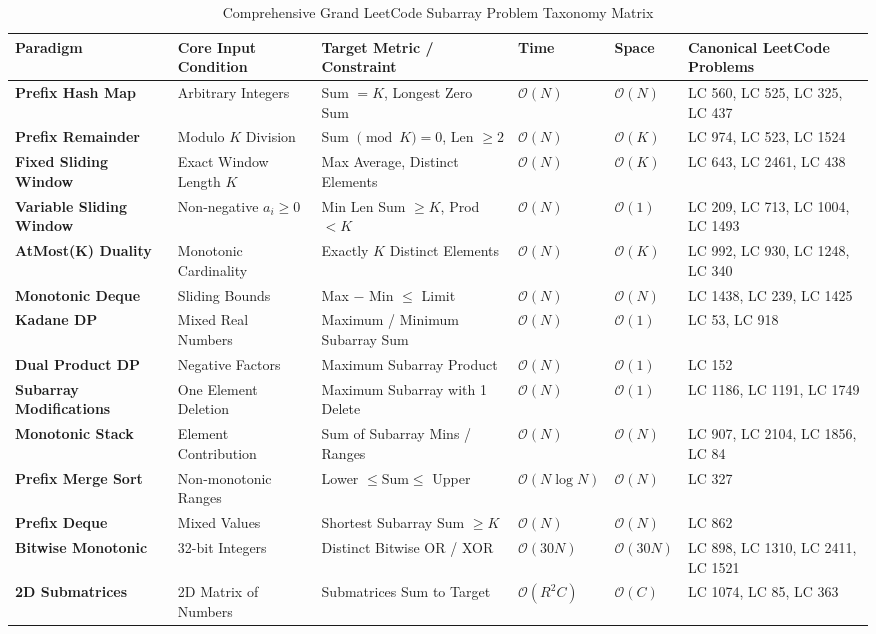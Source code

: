 \documentclass[10pt,journal,compsoc,onecolumn]{IEEEtran}
\begin{document}
\begin{table}[htbp]
\caption{Comprehensive Grand LeetCode Subarray Problem Taxonomy Matrix}
\label{tab:grand_taxonomy}
\centering
\begin{tabular}{p{2.6cm}p{3.0cm}p{3.4cm}p{1.5cm}p{1.4cm}p{3.5cm}}
\toprule
\textbf{Paradigm} & \textbf{Core Input Condition} & \textbf{Target Metric / Constraint} & \textbf{Time} & \textbf{Space} & \textbf{Canonical LeetCode Problems} \\
\midrule
\textbf{Prefix Hash Map} & Arbitrary Integers & Sum $= K$, Longest Zero Sum & $\mathcal{O}(N)$ & $\mathcal{O}(N)$ & LC 560, LC 525, LC 325, LC 437 \\
\textbf{Prefix Remainder} & Modulo $K$ Division & Sum $\pmod K = 0$, Len $\ge 2$ & $\mathcal{O}(N)$ & $\mathcal{O}(K)$ & LC 974, LC 523, LC 1524 \\
\textbf{Fixed Sliding Window} & Exact Window Length $K$ & Max Average, Distinct Elements & $\mathcal{O}(N)$ & $\mathcal{O}(K)$ & LC 643, LC 2461, LC 438 \\
\textbf{Variable Sliding Window} & Non-negative $a_i \ge 0$ & Min Len Sum $\ge K$, Prod $< K$ & $\mathcal{O}(N)$ & $\mathcal{O}(1)$ & LC 209, LC 713, LC 1004, LC 1493 \\
\textbf{AtMost(K) Duality} & Monotonic Cardinality & Exactly $K$ Distinct Elements & $\mathcal{O}(N)$ & $\mathcal{O}(K)$ & LC 992, LC 930, LC 1248, LC 340 \\
\textbf{Monotonic Deque} & Sliding Bounds & Max $-$ Min $\le$ Limit & $\mathcal{O}(N)$ & $\mathcal{O}(N)$ & LC 1438, LC 239, LC 1425 \\
\textbf{Kadane DP} & Mixed Real Numbers & Maximum / Minimum Subarray Sum & $\mathcal{O}(N)$ & $\mathcal{O}(1)$ & LC 53, LC 918 \\
\textbf{Dual Product DP} & Negative Factors & Maximum Subarray Product & $\mathcal{O}(N)$ & $\mathcal{O}(1)$ & LC 152 \\
\textbf{Subarray Modifications} & One Element Deletion & Maximum Subarray with 1 Delete & $\mathcal{O}(N)$ & $\mathcal{O}(1)$ & LC 1186, LC 1191, LC 1749 \\
\textbf{Monotonic Stack} & Element Contribution & Sum of Subarray Mins / Ranges & $\mathcal{O}(N)$ & $\mathcal{O}(N)$ & LC 907, LC 2104, LC 1856, LC 84 \\
\textbf{Prefix Merge Sort} & Non-monotonic Ranges & Lower $\le \text{Sum} \le$ Upper & $\mathcal{O}(N \log N)$ & $\mathcal{O}(N)$ & LC 327 \\
\textbf{Prefix Deque} & Mixed Values & Shortest Subarray Sum $\ge K$ & $\mathcal{O}(N)$ & $\mathcal{O}(N)$ & LC 862 \\
\textbf{Bitwise Monotonic} & 32-bit Integers & Distinct Bitwise OR / XOR & $\mathcal{O}(30 N)$ & $\mathcal{O}(30 N)$ & LC 898, LC 1310, LC 2411, LC 1521 \\
\textbf{2D Submatrices} & 2D Matrix of Numbers & Submatrices Sum to Target & $\mathcal{O}(R^2 C)$ & $\mathcal{O}(C)$ & LC 1074, LC 85, LC 363 \\
\bottomrule
\end{tabular}
\end{table}
\end{document}

